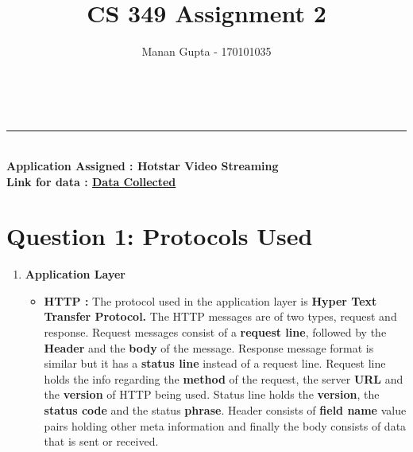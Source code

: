 \documentclass[a4paper,10pt]{article}
\title{CS 349 Assignment 2}
\author{Manan Gupta - 170101035}
\makeatletter
\renewcommand\maketitle{
	{\raggedright {
			\color{RoyalPurple}
		\begin{center}
			{\fontsize{22pt}{22pt} \bfseries \sffamily \@title } \qquad\qquad
			{\fontsize{22pt}{22pt} \bfseries \@author}\\[8ex]
\end{center}}} }
\makeatother
\begin{document}
\maketitle
\vspace{-1cm}
\hrule
\vspace{0.4cm}
\noindent
{\fontsize{18pt}{18pt} \bfseries \sffamily \\Application Assigned : Hotstar Video Streaming\\
Link for data : \href{google.com}{Data Collected}
}
\vspace{-0.3cm}
\section*{Question 1: Protocols Used}
\begin{enumerate}
	\item \textbf{\color{Magenta} \large Application Layer}
	\begin{itemize}
		\item \textbf{HTTP :} The protocol used in the application layer is \textbf{Hyper Text Transfer Protocol.} The HTTP messages are of two types, request and response. Request messages consist of a \textbf{request line}, followed by the \textbf{Header} and the \textbf{body} of the message. Response message format is similar but it has a \textbf{status line} instead of a request line. Request line holds the info regarding the \textbf{method} of the request, the server \textbf{URL} and the \textbf{version} of HTTP being used. Status line holds the \textbf{version}, the \textbf{status code} and the status \textbf{phrase}. Header consists of \textbf{field name} value pairs holding other meta information and finally the body consists of data that is sent or received.
		\begin{figure}[h]
			\centering

\end{figure}
\end{itemize}
\end{enumerate}
\end{document}
